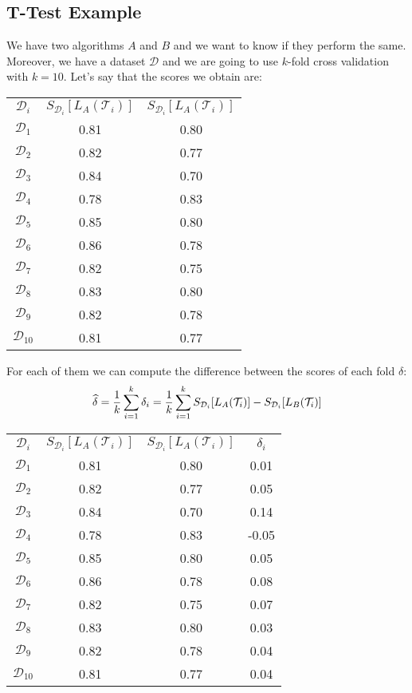 \subsection{T-Test Example}
We have two algorithms $A$ and $B$ and we want to know if they perform the same. Moreover, we have a dataset $\mathcal{D}$ and we are going to use $k$-fold cross validation with $k=10$. Let's say that the scores we obtain are:
\begin{center}
  \begin{tabular}{c|c|c}
    $\mathcal{D}_i$&$S_{\mathcal{D}_i}[L_A(\mathcal{T}_i)]$&$S_{\mathcal{D}_i}[L_A(\mathcal{T}_i)]$\\
  $\mathcal{D}_1$&0.81&0.80\\
  $\mathcal{D}_2$&0.82&0.77\\
  $\mathcal{D}_3$&0.84&0.70\\
  $\mathcal{D}_4$&0.78&0.83\\
  $\mathcal{D}_5$&0.85&0.80\\
  $\mathcal{D}_6$&0.86&0.78\\
  $\mathcal{D}_7$&0.82&0.75\\
  $\mathcal{D}_8$&0.83&0.80\\
  $\mathcal{D}_9$&0.82&0.78\\
  $\mathcal{D}_10$&0.81&0.77
  \end{tabular}
\end{center}
For each of them we can compute the difference between the scores of each fold $\delta$:
\[\widehat{\delta}=\frac{1}{k}\displaystyle\sum_{i=1}^k\delta_i=\frac{1}{k}\displaystyle\sum_{i=1}^kS_{\mathcal{D}_i}[L_A(\mathcal{T}_i)]-S_{\mathcal{D}_i}[L_B(\mathcal{T}_i)]\]
\begin{center}
  \begin{tabular}{c|c|c|c}
    $\mathcal{D}_i$&$S_{\mathcal{D}_i}[L_A(\mathcal{T}_i)]$&$S_{\mathcal{D}_i}[L_A(\mathcal{T}_i)]$&$\delta_i$\\
    $\mathcal{D}_1$&0.81&0.80&0.01\\
    $\mathcal{D}_2$&0.82&0.77&0.05\\
    $\mathcal{D}_3$&0.84&0.70&0.14\\
    $\mathcal{D}_4$&0.78&0.83&-0.05\\
    $\mathcal{D}_5$&0.85&0.80&0.05\\
    $\mathcal{D}_6$&0.86&0.78&0.08\\
    $\mathcal{D}_7$&0.82&0.75&0.07\\
    $\mathcal{D}_8$&0.83&0.80&0.03\\
    $\mathcal{D}_9$&0.82&0.78&0.04\\
    $\mathcal{D}_10$&0.81&0.77&0.04
  \end{tabular}
\end{center}
